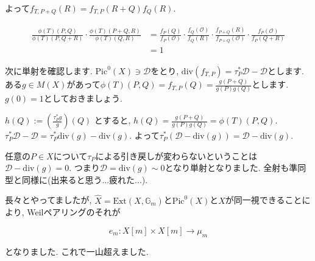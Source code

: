 \documentclass{jsarticle}
\def\Ext{\mathrm{Ext}}
\def\Pic{\mathrm{Pic}}
\def\div{\mathrm{div}}
\theoremstyle{definition}
\numberwithin{theorem}{section}
\begin{document}
よって$f_{T, P+Q}(R) = f_{T, P}(R+Q) f_Q(R)$.

\begin{eqnarray*}
\begin{aligned}
\frac{\phi(T)(P, Q) }{\phi(T)(P, Q+R)} \cdot \frac{\phi(T)(P+Q, R)}{\phi(T)(Q, R)}
&= \frac{f_P(Q)}{f_P(\mathcal{O})} \cdot \frac{f_Q(\mathcal{O})}{f_Q(R)} \cdot \frac{f_{P+Q}(R)}{f_{P+Q}(\mathcal{O})} \cdot \frac{f_P(\mathcal{O})}{f_P(Q+R)}\\
&= 1
\end{aligned}
\end{eqnarray*}

次に単射を確認します. $\Pic^0(X) \ni \mathcal{D}$をとり, $\div(f_{T, P}) = \tau_P^*\mathcal{D} - \mathcal{D}$とします. ある$g \in M(X)$があって$\displaystyle\phi(T)(P, Q) = f_{T, P}(Q) = \frac{g(P+Q)}{g(P) g(Q)}$とします. $g(0) = 1$としておきましょう.

$h(Q) := \left(\frac{\tau_P^*g}{g}\right)(Q)$ とすると, $h(Q) = \frac{g(P+Q)}{g(P)g(Q)} = \phi(T)(P, Q)$. $\tau_P^*\mathcal{D} - \mathcal{D} =\tau_P^*\div(g) - \div(g)$. よって$\tau_P^*(\mathcal{D} - \div(g)) = \mathcal{D} - \div(g)$.

任意の$P \in X$について$\tau_P$による引き戻しが変わらないということは$\mathcal{D} - \div(g) = 0$. つまり$\mathcal{D} = \div(g) \sim 0$となり単射となりました. 全射も準同型と同様に(出来ると思う...疲れた...).

長々とやってましたが, $\hat{X} = \Ext(X, \mathbb{G}_m)$と$\Pic^0(X)$と$X$が同一視できることにより, Weilペアリングのそれが

\begin{equation*}
e_m: X[m] \times X[m] \rightarrow \mu_m
\end{equation*}

となりました. これで一山超えました.
\end{document}
